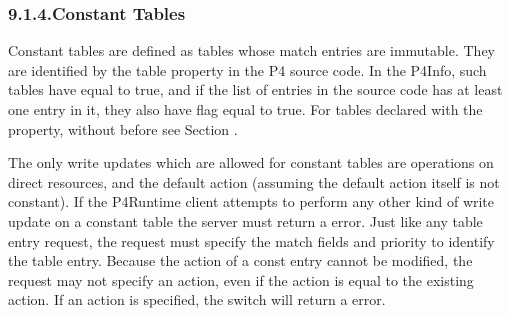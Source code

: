 \documentclass[11pt]{article}
\begin{document}
{%
\subsubsection{9.1.4.\hspace*{0.5em}Constant Tables}\label{sec-constant-tables}%

\noindent{}Constant tables are defined as tables whose match entries are
immutable. They are identified by the table property 
in the P4 source code.  In the P4Info, such tables have
 equal to true, and if the list of entries in the
source code has at least one entry in it, they also have
 flag equal to true.  For tables declared with
the  property, without  before  see Section
.%

The only write updates which are allowed for constant tables are 
operations on direct resources, and the default action (assuming the default
action itself is not constant). If the P4Runtime client attempts to perform any
other kind of write update on a constant table the server must return a
 error. Just like any table entry  request, the
request must specify the match fields and priority to identify the table
entry. Because the action of a const entry cannot be modified, the request
may not specify an action, even if the action is equal to the existing action.
If an action is specified, the switch will return a  error.%

}
\end{document}
